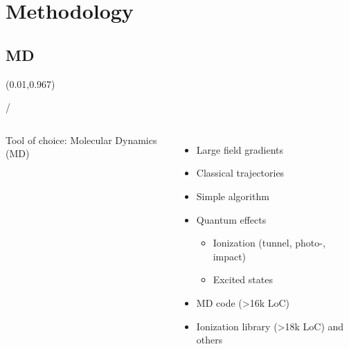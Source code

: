 \documentclass{beamer}
\makeatletter
\newcommand{\framenumber}{
\begin{textblock}{0}(0.01,0.967)
\begin{scriptsize}
{\color{gray}\insertframenumber/\inserttotalframenumber}
\end{scriptsize}
\end{textblock}
}
\makeatother
\begin{document}
\section{Methodology}

\subsection{MD}
\begin{frame}{}\framenumber
\begin{columns}
    Tool of choice: Molecular Dynamics (MD)
    \begin{itemize}
     \item Large field gradients
     \item Classical trajectories
     \item Simple algorithm
     \item Quantum effects
     \begin{itemize}
        \item Ionization (tunnel, photo-, impact)
        \item Excited states
     \end{itemize}
     \item<6-> MD code (>16k LoC)
     \item<6-> Ionization library (>18k LoC) and others
    \end{itemize}
    \color{white}\color{black}

\end{columns}
\end{frame}
\end{document}
